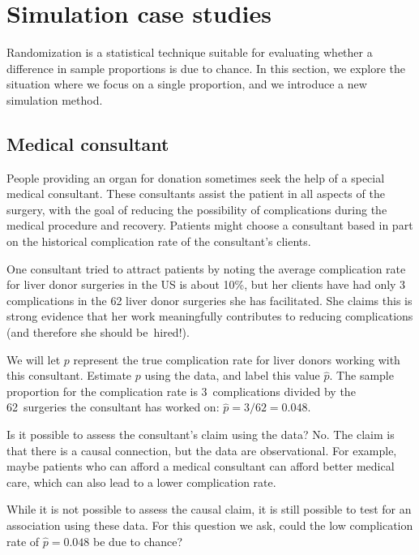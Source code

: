 \section{Simulation case studies}
\label{SimulationCaseStudies}

Randomization is a statistical technique suitable for evaluating whether a difference in sample proportions is due to chance. In this section, we explore the situation where we focus on a single proportion, and we introduce a new simulation method.

\subsection{Medical consultant}

People providing an organ for donation sometimes seek the help of a special medical consultant. These consultants assist the patient in all aspects of the surgery, with the goal of reducing the possibility of complications during the medical procedure and recovery. Patients might choose a consultant based in part on the historical complication rate of the consultant's clients.

One consultant tried to attract patients by noting the average complication rate for liver donor surgeries in the US is about 10\%, but her clients have had only 3 complications in the 62 liver donor surgeries she has facilitated. She claims this is strong evidence that her work meaningfully contributes to reducing complications (and therefore she should be~hired!).

\begin{example}{We will let $p$ represent the true complication rate for liver donors working with this consultant. Estimate $p$ using the data, and label this value $\hat{p}$.}
The sample proportion for the complication rate is 3~complications divided by the 62~surgeries the consultant has worked on: $\hat{p} = 3/62 = 0.048$.
\end{example}

\begin{example}{Is it possible to assess the consultant's claim using the data?}
No. The claim is that there is a causal connection, but the data are observational. For example, maybe patients who can afford a medical consultant can afford better medical care, which can also lead to a lower complication rate.

While it is not possible to assess the causal claim, it is still possible to test for an association using these data. For this question we ask, could the low complication rate of $\hat{p} = 0.048$ be due to chance?
\end{example}


